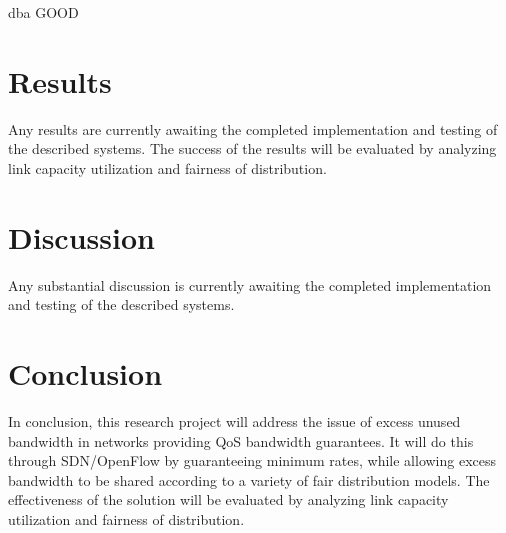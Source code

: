 \documentclass[accepted,single]{gipaper}
\begin{document}
dba GOOD

\section{Results}
\label{results}

Any results are currently awaiting the completed implementation and testing of the described systems. The success of the results will be evaluated by analyzing link capacity utilization and fairness of distribution.

\section{Discussion}
\label{discussion}

Any substantial discussion is currently awaiting the completed implementation and testing of the described systems.

\section{Conclusion}
\label{conclusion}

In conclusion, this research project will address the issue of excess unused bandwidth in networks providing QoS bandwidth guarantees. It will do this through SDN/OpenFlow by guaranteeing minimum rates, while allowing excess bandwidth to be shared according to a variety of fair distribution models. The effectiveness of the solution will be evaluated by analyzing link capacity utilization and fairness of distribution.


\end{document}
